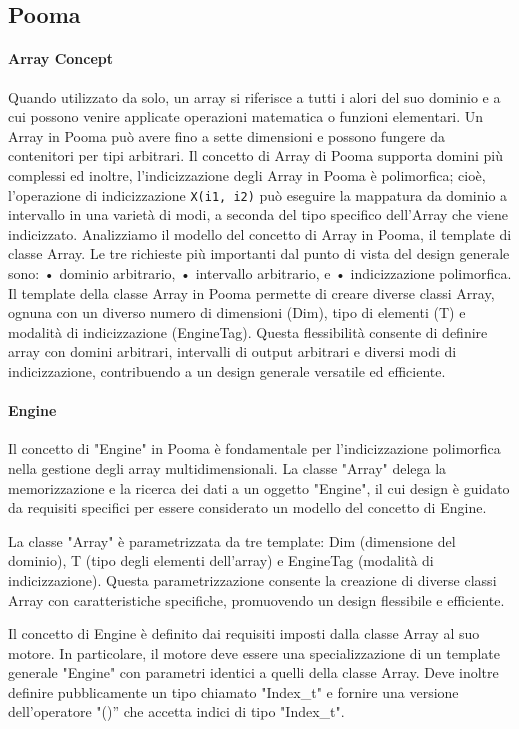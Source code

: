 \documentclass[11pt]{article}
\begin{document}
\begin{multicols*}{2}[\columnsep=1cm]
    \subsection{Pooma}
    \paragraph{Array Concept}
    Quando utilizzato da solo, un array si riferisce a tutti i alori del suo dominio e a cui possono venire applicate operazioni matematica o funzioni elementari.
    Un Array in Pooma può avere fino a sette dimensioni e possono fungere da contenitori per tipi arbitrari. 
    Il concetto di Array di Pooma supporta domini più complessi ed inoltre, l'indicizzazione degli Array in Pooma è polimorfica; cioè, l'operazione di indicizzazione \texttt{X(i1, i2)} può eseguire la mappatura da dominio a intervallo in una varietà di modi, a seconda del tipo specifico dell'Array che viene indicizzato.
    Analizziamo il modello del concetto di Array in Pooma, il template di classe Array.
    Le tre richieste più importanti dal punto di vista del design generale sono:
    • dominio arbitrario,
    • intervallo arbitrario, e
    • indicizzazione polimorfica.
    Il template della classe Array in Pooma permette di creare diverse classi Array, ognuna con un diverso numero di dimensioni (Dim), tipo di elementi (T) e modalità di indicizzazione (EngineTag). Questa flessibilità consente di definire array con domini arbitrari, intervalli di output arbitrari e diversi modi di indicizzazione, contribuendo a un design generale versatile ed efficiente.
    
    \paragraph{Engine}
    Il concetto di "Engine" in Pooma è fondamentale per l'indicizzazione polimorfica nella gestione degli array multidimensionali. La classe "Array" delega la memorizzazione e la ricerca dei dati a un oggetto "Engine", il cui design è guidato da requisiti specifici per essere considerato un modello del concetto di Engine.

    La classe "Array" è parametrizzata da tre template: Dim (dimensione del dominio), T (tipo degli elementi dell'array) e EngineTag (modalità di indicizzazione). Questa parametrizzazione consente la creazione di diverse classi Array con caratteristiche specifiche, promuovendo un design flessibile e efficiente.

    Il concetto di Engine è definito dai requisiti imposti dalla classe Array al suo motore. In particolare, il motore deve essere una specializzazione di un template generale "Engine" con parametri identici a quelli della classe Array. Deve inoltre definire pubblicamente un tipo chiamato "Index\_t" e fornire una versione dell'operatore "()” che accetta indici di tipo "Index\_t".


\end{multicols*}
\end{document}
